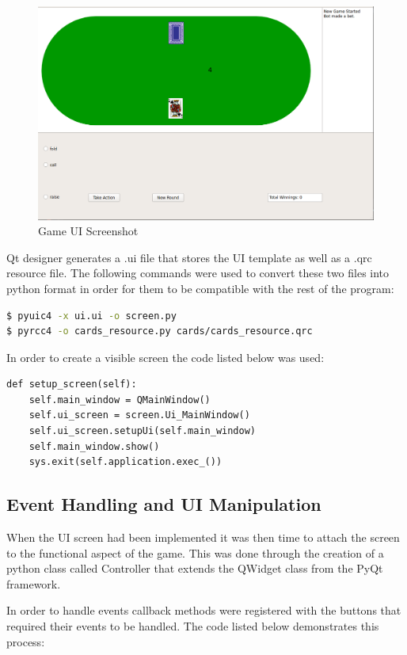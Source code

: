 \begin{figure}[ht]
    \includegraphics[scale=.4]{images/UI_screenshot.png}
    \caption{Game UI Screenshot}
\end{figure}

Qt designer generates a .ui file that stores the UI template as well as a .qrc resource file.
The following commands were used to convert these two files into python format in order for them
to be compatible with the rest of the program:
\begin{lstlisting}[language=bash]
$ pyuic4 -x ui.ui -o screen.py
$ pyrcc4 -o cards_resource.py cards/cards_resource.qrc
\end{lstlisting}

In order to create a visible screen the code listed below was used:
\begin{lstlisting}[style=Python]
def setup_screen(self):
    self.main_window = QMainWindow()
    self.ui_screen = screen.Ui_MainWindow()
    self.ui_screen.setupUi(self.main_window)
    self.main_window.show()
    sys.exit(self.application.exec_())
\end{lstlisting}

\subsection{Event Handling and UI Manipulation}\label{subsec:eventHandling}
When the UI screen had been implemented it was then time to attach the screen to the
functional aspect of the game.
This was done through the creation of a python class called Controller that extends the QWidget
class from the PyQt framework.

In order to handle events callback methods were registered with the buttons that required their events to be handled.
The code listed below demonstrates this process:

